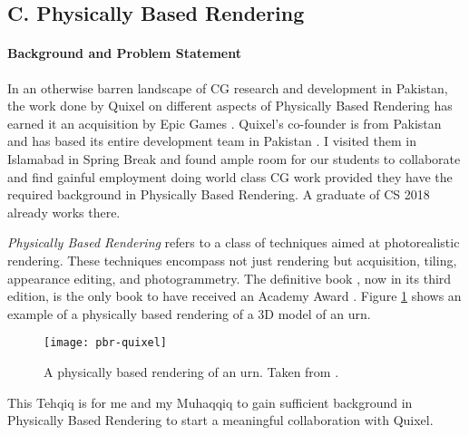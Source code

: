 \documentclass{article}
\begin{document}

\subsection*{C. Physically Based Rendering}

\paragraph{Background and Problem Statement} In an otherwise barren landscape of CG research and development in Pakistan, the work done by Quixel \cite{quixel} on different aspects of Physically Based Rendering has earned it an acquisition \cite{quixel_epic} by Epic Games \cite{epic}. Quixel's co-founder is from Pakistan and has based its entire development team in Pakistan \cite{quixel_about}. I visited them in Islamabad in Spring Break and found ample room for our students to collaborate and find gainful employment doing world class CG work provided they have the required background in Physically Based Rendering. A graduate of CS 2018 already works there.

\textit{Physically Based Rendering} refers to a class of techniques aimed at photorealistic rendering. These techniques encompass not just rendering but acquisition, tiling, appearance editing, and photogrammetry. The definitive book \cite{pbrt}, now in its third edition, \cite{pharrJH_2016} is the only book to have received an Academy Award \cite{pbrt_award}. Figure \ref{fig:pbr} shows an example of a physically based rendering of a 3D model of an urn.

\begin{figure}
  \centering
  \texttt{[image: pbr-quixel]}
  \caption{A physically based rendering of an urn. Taken from \cite{quixel_mixer}.}
  \label{fig:pbr}
\end{figure}

This Tehqiq is for me and my Muhaqqiq to gain sufficient background in Physically Based Rendering to start a meaningful collaboration with Quixel.
\end{document}

